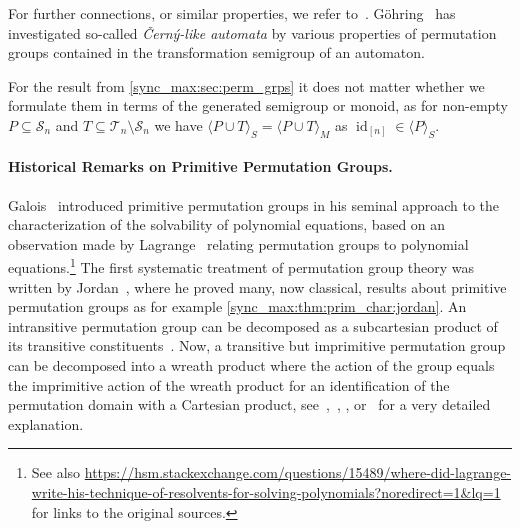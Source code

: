 For further connections, or similar properties, we refer to~\cite{andre2016,araujo2019,araujo2021,araujo2013,AraujoCameron2014,ArCamSt2017,doi:10.1112/plms/pdw040,bray2020}.
Göhring~\cite{DBLP:journals/jalc/Gohring97}
has investigated so-called \emph{\v{C}ern\'y-like automata}
by various properties of permutation groups contained in the transformation
semigroup of an automaton.

For the result from \cref{sync_max:sec:perm_grps}
it does not matter whether we formulate them in terms of the generated 
semigroup or monoid, as for non-empty $P \subseteq \mathcal S_n$
and $T \subseteq \mathcal T_n \setminus \mathcal S_n$ we have 
$
\langle P \cup T \rangle_S = \langle P \cup T \rangle_M
$
as $\operatorname{id}_{[n]} \in \langle P \rangle_S$.




\paragraph{Historical Remarks on Primitive Permutation Groups.} %
Galois~\cite{Neumann2011} introduced primitive permutation groups  
in his seminal approach
 to the characterization
of the solvability of polynomial equations,
based on an observation made by Lagrange~\cite{lagrangecollected2}
relating permutation groups to polynomial equations.\footnote{See also \url{https://hsm.stackexchange.com/questions/15489/where-did-lagrange-write-his-technique-of-resolvents-for-solving-polynomials?noredirect=1&lq=1} for links to the original sources.}
The first systematic treatment of permutation group theory 
was written by 
Jordan~\cite{jordan1870},
where he proved many, now classical, results about primitive permutation groups
as for example \cref{sync_max:thm:prim_char:jordan}.
An intransitive permutation group can be decomposed as a subcartesian product of its transitive constituents~\cite[Thm.~1.2]{cameron_1999}.
Now, a transitive but imprimitive permutation group
can be decomposed into 
a wreath product 
where the action of the group equals the imprimitive
action of the wreath product for an identification
of the permutation domain with a Cartesian product,  
see~\cite[Thm.~1.8]{cameron_1999},~\cite{kovacs1989}, \cite[Sect.~2,6]{dixon1996permutation},
or~\cite[Sect.~4.4]{Kurzweil04} for a very detailed explanation.
 
